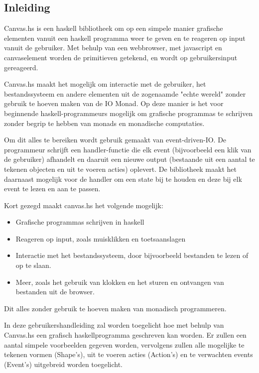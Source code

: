 \subsection{Inleiding}

Canvas.hs is een haskell bibliotheek om op een simpele manier grafische elementen vanuit een haskell programma weer te geven en te reageren op input vanuit de gebruiker. Met behulp van een webbrowser, met javascript en canvaselement worden de primitieven getekend, en wordt op gebruikersinput gereageerd.

Canvas.hs maakt het mogelijk om interactie met de gebruiker, het bestandssysteem en andere elementen uit de zogenaamde "echte wereld" zonder gebruik te hoeven maken van de IO Monad. Op deze manier is het voor beginnende haskell-programmeurs mogelijk om grafische programmas te schrijven zonder begrip te hebben van monads en monadische computaties.

Om dit alles te bereiken wordt gebruik gemaakt van event-driven-IO. De programmeur schrijft een handler-functie die elk event (bijvoorbeeld een klik van de gebruiker) afhandelt en daaruit een nieuwe output (bestaande uit een aantal te tekenen objecten en uit te voeren acties) oplevert. De bibliotheek maakt het daarnaast mogelijk voor de handler om een state bij te houden en deze bij elk event te lezen en aan te passen. 

Kort gezegd maakt canvas.hs het volgende mogelijk:
\begin{itemize}
	\item Grafische programmas schrijven in haskell
	\item Reageren op input, zoals muisklikken en toetsaanslagen
	\item Interactie met het bestandssysteem, door bijvoorbeeld bestanden te lezen of op te slaan.
	\item Meer, zoals het gebruik van klokken en het sturen en ontvangen van bestanden uit de browser.
\end{itemize}
Dit alles zonder gebruik te hoeven maken van monadisch programmeren. 


In deze gebruikershandleiding zal worden toegelicht hoe met behulp van Canvas.hs een grafisch haskellprogramma geschreven kan worden. Er zullen een aantal simpele voorbeelden gegeven worden, vervolgens zullen alle mogelijke te tekenen vormen (Shape's), uit te voeren acties (Action's) en te verwachten events (Event's) uitgebreid worden toegelicht. 